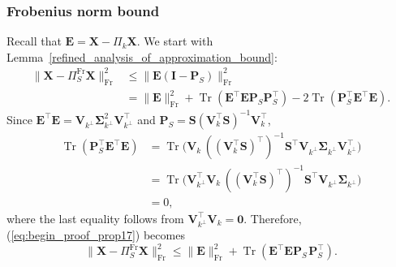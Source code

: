 \documentclass[twoside,11pt]{book}
\numberwithin{theorem}{chapter}
\numberwithin{definition}{chapter}
\numberwithin{proposition}{chapter}
\numberwithin{corollary}{chapter}
\numberwithin{example}{chapter}
\numberwithin{lemma}{chapter}
\numberwithin{assumption}{chapter}
\numberwithin{equation}{chapter}
\numberwithin{figure}{chapter}
\DeclareMathOperator{\Tr}{Tr}
\DeclareMathOperator{\Fr}{\mathrm{Fr}}
\DeclareMathOperator{\Tran}{\intercal}
\begin{document}
\subsubsection{Frobenius norm bound}
\label{s:frobNormThm19}
Recall that $\bm{E} = \bm{X} - \Pi_{k}\bm{X}$.
We start with Lemma~\ref{refined_analysis_of_approximation_bound}:
\begin{equation}
\label{eq:begin_proof_prop17}
	\begin{split}
		\| \bm{X} - \Pi_{S}^{\Fr}\bm{X} \|_{\Fr}^{2}  & \leq  \| \bm{E}(\bm{I}-\bm{P}_{S})\|_{\Fr}^{2}\\
		& = \| \bm{E}\|_{\Fr}^{2} + \Tr(\bm{E}^{\Tran}\bm{E}\bm{P}_{S}\bm{P}_{S}^{\Tran}) - 2\Tr(\bm{P}_{S}^{\Tran}		\bm{E}^{\Tran}\bm{E}).
	\end{split}
\end{equation}
Since $\bm{E}^{\Tran}\bm{E} = \bm{V}_{k^{\perp}}^{\phantom{\Tran}}\bm{\Sigma}_{k^{\perp}}^{2}\bm{V}_{k^{\perp}}^{\Tran}$ and $\bm{P}_{S} = \bm{S}(\bm{V}_{k}^{\Tran}\bm{S})^{-1}\bm{V}_{k}^{\Tran}$,
\begin{equation}
        \begin{split}
        		\Tr(\bm{P}_{S}^{\Tran}\bm{E}^{\Tran}\bm{E})  & =  \Tr \bigg(\bm{V}_{k}^{\phantom{\Tran}}((\bm{V}_{k}^{\Tran}		\bm{S})^{\Tran})^{-1}\bm{S}^{\Tran}\bm{V}_{k^{\perp}}^{\phantom{\Tran}}\bm{\Sigma}_{k^{\perp}}^{\phantom{\Tran}}\bm{V}		_{k^{\perp}}^{\Tran} \bigg)  \\
        		& = \Tr \bigg( \bm{V}_{k^{\perp}}^{\Tran}\bm{V}_{k}^{\phantom{\Tran}}((\bm{V}_{k}^{\Tran}\bm{S})^{\Tran})^{-1}\bm{S}		^{\Tran}\bm{V}_{k^{\perp}}^{\phantom{\Tran}}\bm{\Sigma}_{k^{\perp}}^{\phantom{\Tran}} \bigg)  \\
      		  & = 0,
        \end{split}
\end{equation}
where the last equality follows from $\bm{V}_{k^{\perp}}^{\Tran}\bm{V}_{k} = \bm{0}$.
Therefore, (\ref{eq:begin_proof_prop17}) becomes
\begin{equation}
	\| \bm{X} - \Pi_{S}^{\Fr}\bm{X} \|_{\Fr}^{2}  \leq \| \bm{E}\|_{\Fr}^{2} + \Tr(\bm{E}^{\Tran}\bm{E}\bm{P}^{\phantom{\Tran}}	_{S}\bm{P}^{\Tran}_{S}).
\end{equation}
\end{document}
